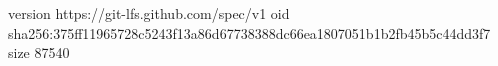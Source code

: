 version https://git-lfs.github.com/spec/v1
oid sha256:375ff11965728c5243f13a86d67738388dc66ea1807051b1b2fb45b5c44dd3f7
size 87540
